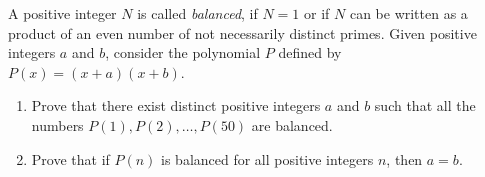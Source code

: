 A positive integer $N$ is called \emph{balanced}, if $N = 1$ or if $N$ can be written as a product of an even number of not necessarily distinct primes. Given positive integers $a$ and $b$, consider the polynomial $P$ defined by $P(x) = (x + a)(x + b)$.

\begin{enumerate}
\item[(a)] Prove that there exist distinct positive integers $a$ and $b$ such that all the numbers $P(1), P(2), \ldots, P(50)$ are balanced.
\item[(b)] Prove that if $P(n)$ is balanced for all positive integers $n$, then $a = b$.
\end{enumerate}
